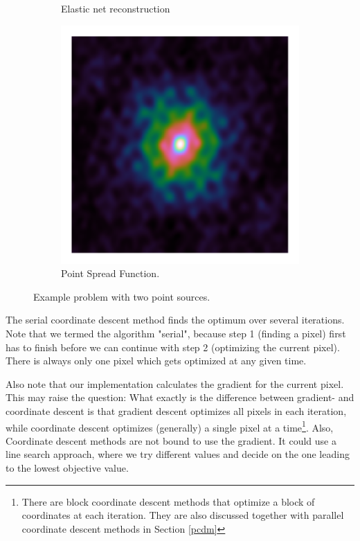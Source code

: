 \begin{figure}[h]
\begin{subfigure}[b]{0.3\linewidth}
		\caption{Elastic net reconstruction}
		\label{cd:serial:aid:elastic}
	\end{subfigure}
	\begin{subfigure}[b]{0.3\linewidth}
		\includegraphics[width=\linewidth, clip, trim= 0.25in 0.25in 0.25in 0.25in]{./chapters/03.cd/simulated/psf.png}
		\caption{Point Spread Function.}
		\label{cd:serial:aid:psf}
	\end{subfigure}

	\caption{Example problem with two point sources.}
	\label{cd:serial:aid:figure}
\end{figure}

The serial coordinate descent method finds the optimum over several iterations. Note that we termed the algorithm "serial", because step 1 (finding a pixel) first has to finish before we can continue with step 2 (optimizing the current pixel). There is always only one pixel which gets optimized at any given time.

Also note that our implementation calculates the gradient for the current pixel. This may raise the question: What exactly is the difference between gradient- and coordinate descent is that gradient descent optimizes all pixels in each iteration, while coordinate descent optimizes (generally) a single pixel at a time\footnote{There are block coordinate descent methods that optimize a block of coordinates at each iteration. They are also discussed together with parallel coordinate descent methods in Section \ref{pcdm}}. Also, Coordinate descent methods are not bound to use the gradient. It could use a line search approach, where we try different values and decide on the one leading to the lowest objective value.

